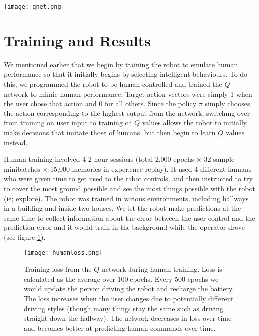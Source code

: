 \documentclass[conference, 12pt]{IEEEtran} %
\begin{document}
		\begin{figure*}[ht]
	\centering
	\texttt{[image: qnet.png]}
	\caption{The simplified diagram showing how the convolutional autoencoder compresses the imput state ($64 \times 64 \times 1$ into an encoded vector, and then deconvolves it to recreate the output.).}
	\label{fig:qnet}
\end{figure*}


	\section{Training and Results}
	\par We mentioned earlier that we begin by training the robot to emulate human performance so that it initially begins by selecting intelligent behaviours. To do this, we programmed the robot to be human controlled and trained the $Q$ network to mimic human performance. Target action vectors were simply 1 when the user chose that action and 0 for all others. Since the policy $\pi$ simply chooses the action corresponding to the highest output from the network, switching over from training on user input to training on $Q$ values allows the robot to initially make decisions that imitate those of humans, but then begin to learn $Q$ values instead.
	\par Human training involved 4 2-hour sessions (total 2,000 epochs $\times$ 32-sample minibatches $\times$ 15,000 memories in experience replay). It used 4 different humans who were given time to get used to the robot controls, and then instructed to try to cover the most ground possible and see the most things possible with the robot (ie; explore). The robot was trained in various environments, including hallways in a building and inside two houses. We let the robot make predictions at the same time to collect information about the error between the user control and the prediction error and it would train in the background while the operator drove (see figure \ref{fig:humanloss}).
	\begin{figure}[ht]
		\centering
		\texttt{[image: humanloss.png]}
		\caption{Training loss from the $Q$ network during human training. Loss is calculated as the average over 100 epochs. Every 500 epochs we would update the person driving the robot and recharge the battery. The loss increases when the user changes due to potentially different driving styles (though many things stay the same such as driving straight down the hallway). The network decreases in loss over time and becomes better at predicting human commands over time.}
		\label{fig:humanloss}
	\end{figure}
\end{document}
